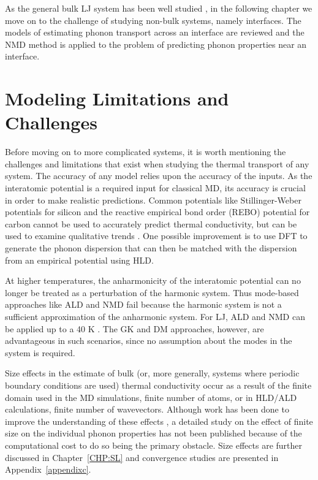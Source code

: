 As the general bulk LJ system has been well studied \cite{mcgaugheythesis,turneythesis}, in the following chapter we move on to the challenge of studying non-bulk systems, namely interfaces. The models of estimating phonon transport across an interface are reviewed and the NMD method is applied to the problem of predicting phonon properties near an interface.

\section {Modeling Limitations and Challenges}

Before moving on to more complicated systems, it is worth mentioning the challenges and limitations that exist when studying the thermal transport of any system. The accuracy of any model relies upon the accuracy of the inputs. As the interatomic potential is a required input for classical MD, its accuracy is crucial in order to make realistic predictions. Common potentials like Stillinger-Weber potentials for silicon \cite{PhysRevB.65.144306} and the reactive empirical bond order (REBO) potential for carbon \cite{lukes2007thermal} cannot be used to accurately predict thermal conductivity, but can be used to examine qualitative trends \cite{landrythesis}. One possible improvement is to use DFT to generate the phonon dispersion that can then be matched with the dispersion from an empirical potential using HLD.

At higher temperatures, the anharmonicity of the interatomic potential can no longer be treated as a perturbation of the harmonic system. Thus mode-based approaches like ALD and NMD fail because the harmonic system is not a sufficient approximation of the anharmonic system. For LJ, ALD and NMD can be applied up to a 40 K \cite{PhysRevB.79.064301}. The GK and DM approaches, however, are advantageous in such scenarios, since no assumption about the modes in the system is required.

Size effects in the estimate of bulk (or, more generally, systems where periodic boundary conditions are used) thermal conductivity occur as a result of the finite domain used in the MD simulations, finite number of atoms, or in HLD/ALD calculations, finite number of wavevectors. Although work has been done to improve the understanding of these effects \cite{PhysRevB.81.214305}, a detailed study on the effect of finite size on the individual phonon properties has not been published because of the computational cost to do so being the primary obstacle. Size effects are further discussed in Chapter~\ref{CHP:SL} and convergence studies are presented in Appendix~\ref{appendixc}.

